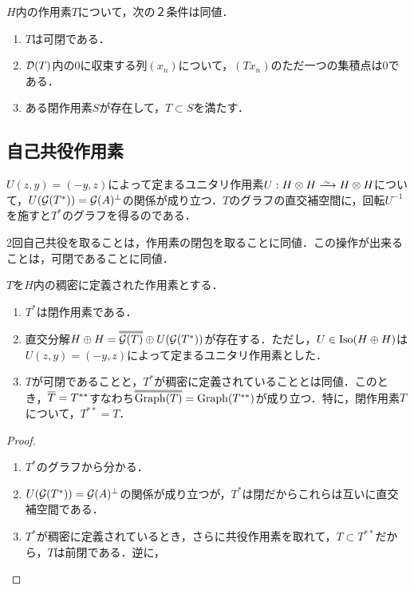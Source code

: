 \documentclass[uplatex,dvipdfmx]{jsreport}
\begin{document}
\begin{lemma}[可閉性の特徴付け]
    $H$内の作用素$T$について，次の２条件は同値．
    \begin{enumerate}
        \item $T$は可閉である．
        \item $\mathcal{D}(T)$内の$0$に収束する列$(x_n)$について，$(Tx_n)$のただ一つの集積点は$0$である．
        \item ある閉作用素$S$が存在して，$T\subset S$を満たす．
    \end{enumerate}
\end{lemma}

\subsection{自己共役作用素}

\begin{tcolorbox}[colframe=ForestGreen, colback=ForestGreen!10!white,breakable,colbacktitle=ForestGreen!40!white,coltitle=black,fonttitle=\bfseries\sffamily,
title=]
    $U(z,y)=(-y,z)$によって定まるユニタリ作用素$U:H\otimes H\iso H\otimes H$について，$U(\mathcal{G}(T^*))=\mathcal{G}(A)^\perp$の関係が成り立つ．$T$のグラフの直交補空間に，回転$U^{-1}$を施すと$T^*$のグラフを得るのである．

    2回自己共役を取ることは，作用素の閉包を取ることに同値．この操作が出来ることは，可閉であることに同値．
\end{tcolorbox}

\begin{theorem}[可閉性の自己共役作用素による特徴付け]\label{thm-closable-and-ajoint-operator}
    $T$を$H$内の稠密に定義された作用素とする．
    \begin{enumerate}
        \item $T^*$は閉作用素である．
        \item 直交分解$H\oplus H=\oo{\cG(T)}\oplus U(\cG(T^*))$が存在する．ただし，$U\in\mathrm{Iso}(H\oplus H)$は$U(z,y)=(-y,z)$によって定まるユニタリ作用素とした．
        \item $T$が可閉であることと，$T^*$が稠密に定義されていることとは同値．このとき，$\overline{T}=T^{**}$すなわち$\oo{\Graph(T)}=\Graph(T^{**})$が成り立つ．特に，閉作用素$T$について，$T^{**}=T$．
    \end{enumerate}
\end{theorem}
\begin{proof}\mbox{}
    \begin{enumerate}
        \item $T^*$のグラフから分かる．
        \item $U(\mathcal{G}(T^*))=\mathcal{G}(A)^\perp$の関係が成り立つが，$T^*$は閉だからこれらは互いに直交補空間である．
        \item $T^*$が稠密に定義されているとき，さらに共役作用素を取れて，$T\subset T^{**}$だから，$T$は前閉である．逆に，
    \end{enumerate}
\end{proof}
\end{document}
